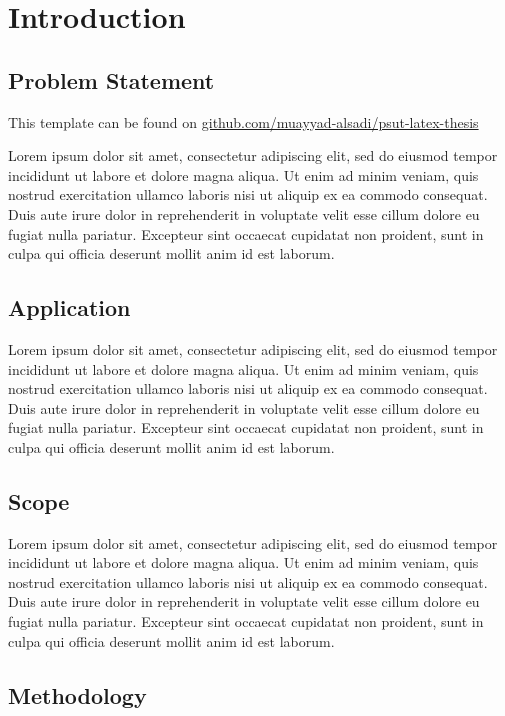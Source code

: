 \chapter{Introduction}
\setcounter{page}{1}

\section{Problem Statement}

This template can be found on \href{https://github.com/muayyad-alsadi/psut-latex-thesis}{github.com/muayyad-alsadi/psut-latex-thesis}

Lorem ipsum dolor sit amet, consectetur adipiscing elit,
sed do eiusmod tempor incididunt ut labore et dolore magna aliqua.
Ut enim ad minim veniam, quis nostrud exercitation ullamco laboris nisi ut aliquip ex ea commodo consequat.
Duis aute irure dolor in reprehenderit in voluptate velit esse cillum dolore eu fugiat nulla pariatur.
Excepteur sint occaecat cupidatat non proident, sunt in culpa qui officia deserunt mollit anim id est laborum.


\section{Application}

Lorem ipsum dolor sit amet, consectetur adipiscing elit,
sed do eiusmod tempor incididunt ut labore et dolore magna aliqua.
Ut enim ad minim veniam, quis nostrud exercitation ullamco laboris nisi ut aliquip ex ea commodo consequat.
Duis aute irure dolor in reprehenderit in voluptate velit esse cillum dolore eu fugiat nulla pariatur.
Excepteur sint occaecat cupidatat non proident, sunt in culpa qui officia deserunt mollit anim id est laborum.

\section{Scope}

Lorem ipsum dolor sit amet, consectetur adipiscing elit,
sed do eiusmod tempor incididunt ut labore et dolore magna aliqua.
Ut enim ad minim veniam, quis nostrud exercitation ullamco laboris nisi ut aliquip ex ea commodo consequat.
Duis aute irure dolor in reprehenderit in voluptate velit esse cillum dolore eu fugiat nulla pariatur.
Excepteur sint occaecat cupidatat non proident, sunt in culpa qui officia deserunt mollit anim id est laborum.

\section{Methodology}

